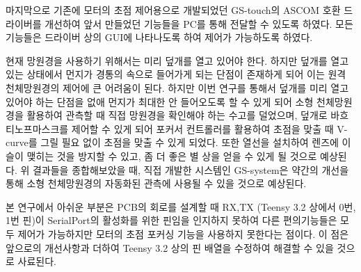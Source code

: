 마지막으로 기존에 모터의 초점 제어용으로 개발되었던 GS-touch의 ASCOM 호환 드라이버를 개선하여 앞서 만들었던 기능들을 PC를 통해 전달할 수 있도록 하였다. 모든 기능들은 드라이버 상의 GUI에 나타나도록 하여 제어가 가능하도록 하였다.


현재 망원경을 사용하기 위해서는 미리 덮개를 열고 있어야 한다. 하지만 덮개를 열고 있는 상태에서 먼지가 경통의 속으로 들어가게 되는 단점이 존재하게 되어 이는 원격 천체망원경의 제어에 큰 어려움이 된다. 하지만 이번 연구를 통해서 덮개를 미리 열고 있어야 하는 단점을 없애 먼지가 최대한 안 들어오도록 할 수 있게 되어 소형 천체망원경을 활용하여 관측할 때 직접 망원경을 확인해야 하는 수고를 덜었으며, 덮개로 바흐티노프마스크를 제어할 수 있게 되어 포커서 컨트롤러를 활용하여 초점을 맞출 때 V-curve를 그릴 필요 없이 초점을 맞출 수 있게 되었다. 또한 열선을 설치하여 렌즈에 이슬이 맺히는 것을 방지할 수 있고, 좀 더 좋은 별 상을 얻을 수 있게 될 것으로 예상된다. 위 결과들을 종합해보았을 때, 직접 개발한 시스템인 GS-system은 약간의 개선을 통해 소형 천체망원경의 자동화된 관측에 사용될 수 있을 것으로 예상된다.


본 연구에서 아쉬운 부분은 PCB의 회로를 설계할 때 RX,TX (Teensy 3.2 상에서 0번, 1번 핀)이 SerialPort의 활성화를 위한 핀임을 인지하지 못하여 다른 편의기능들은 모두 제어가 가능하지만 모터의 초점 포커싱 기능을 사용하지 못한다는 점이다. 이 점은 앞으로의 개선사항과 더하여 Teensy 3.2 상의 핀 배열을 수정하여 해결할 수 있을 것으로 사료된다.